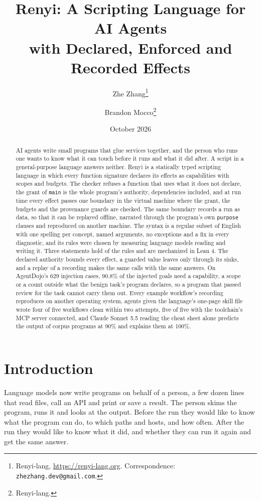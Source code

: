 \documentclass[11pt]{article}
\title{Renyi: A Scripting Language for AI Agents\\
  with Declared, Enforced and Recorded Effects}
\author{Zhe Zhang\thanks{Renyi-lang, \url{https://renyi-lang.org}.
  Correspondence: \texttt{zhezhang.dev@gmail.com}.}
  \and Brandon Mocco\thanks{Renyi-lang.}}
\date{October 2026}
\begin{document}
\maketitle

\begin{abstract}
AI agents write small programs that glue services together, and the
person who runs one wants to know what it can touch before it runs and
what it did after. A script in a general-purpose language answers
neither. Renyi is a statically typed scripting language in which every
function signature declares its effects as capabilities with scopes and
budgets. The checker refuses a function that uses what it does not
declare, the grant of \texttt{main} is the whole program's authority,
dependencies included, and at run time every effect passes one boundary
in the virtual machine where the grant, the budgets and the provenance
guards are checked. The same boundary records a run as data, so that it
can be replayed offline, narrated through the program's own
\texttt{purpose} clauses and reproduced on another machine. The syntax
is a regular subset of English with one spelling per concept, named
arguments, no exceptions and a fix in every diagnostic, and its rules
were chosen by measuring language models reading and writing it. Three
statements hold of the rules and are mechanized in Lean 4. The declared
authority bounds every effect, a guarded value leaves only through its
sinks, and a replay of a recording makes the same calls with the same
answers. On AgentDojo's 629 injection cases, 90.8\% of the injected
goals need a capability, a scope or a count outside what the benign
task's program declares, so a program that passed review for the task
cannot carry them out. Every example workflow's recording reproduces on
another operating system, agents given the language's one-page skill
file wrote four of five workflows clean within two attempts, five of
five with the toolchain's MCP server connected, and Claude
Sonnet 5.5 reading the cheat sheet alone predicts the output of corpus
programs at 90\% and explains them at 100\%.
\end{abstract}

\section{Introduction}

Language models now write programs on behalf of a person, a few dozen
lines that read files, call an API and print or save a result. The
person skims the program, runs it and looks at the output. Before the
run they would like to know what the program can do, to which paths and
hosts, and how often. After the run they would like to know what it
did, and whether they can run it again and get the same answer.
\end{document}
